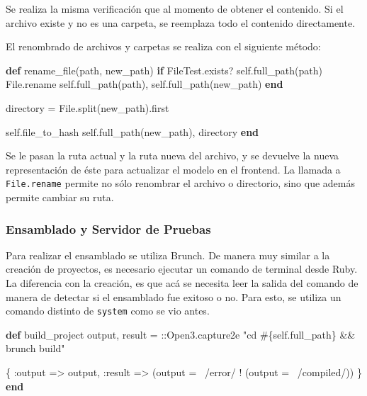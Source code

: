 \documentclass[12pt,spanish,letter]{report}
\newenvironment{Shaded}{}{}
\newcommand{\KeywordTok}[1]{\textcolor[rgb]{0.00,0.44,0.13}{\textbf{{#1}}}}
\newcommand{\DataTypeTok}[1]{\textcolor[rgb]{0.56,0.13,0.00}{{#1}}}
\newcommand{\DecValTok}[1]{\textcolor[rgb]{0.25,0.63,0.44}{{#1}}}
\newcommand{\StringTok}[1]{\textcolor[rgb]{0.25,0.44,0.63}{{#1}}}
\newcommand{\OtherTok}[1]{\textcolor[rgb]{0.00,0.44,0.13}{{#1}}}
\newcommand{\NormalTok}[1]{{#1}}
\begin{document}
Se realiza la misma verificación que al momento de obtener el contenido.
Si el archivo existe y no es una carpeta, se reemplaza todo el contenido
directamente.

El renombrado de archivos y carpetas se realiza con el siguiente método:

\begin{Shaded}
\begin{Highlighting}[]
\KeywordTok{def} \NormalTok{rename_file(path, new_path)}
  \KeywordTok{if} \DataTypeTok{FileTest}\NormalTok{.exists? }\DecValTok{self}\NormalTok{.full_path(path)}
    \DataTypeTok{File}\NormalTok{.rename }\DecValTok{self}\NormalTok{.full_path(path), }\DecValTok{self}\NormalTok{.full_path(new_path)}
  \KeywordTok{end}

  \NormalTok{directory = }\DataTypeTok{File}\NormalTok{.split(new_path).first}

  \DecValTok{self}\NormalTok{.file_to_hash }\DecValTok{self}\NormalTok{.full_path(new_path), directory}
\KeywordTok{end}
\end{Highlighting}
\end{Shaded}

Se le pasan la ruta actual y la ruta nueva del archivo, y se devuelve la
nueva representación de éste para actualizar el modelo en el frontend.
La llamada a \texttt{File.rename} permite no sólo renombrar el archivo o
directorio, sino que además permite cambiar su ruta.

\subsubsection{Ensamblado y Servidor de Pruebas}

Para realizar el ensamblado se utiliza Brunch. De manera muy similar a
la creación de proyectos, es necesario ejecutar un comando de terminal
desde Ruby. La diferencia con la creación, es que acá se necesita leer
la salida del comando de manera de detectar si el ensamblado fue exitoso
o no. Para esto, se utiliza un comando distinto de \texttt{system} como
se vio antes.

\begin{Shaded}
\begin{Highlighting}[]
\KeywordTok{def} \NormalTok{build_project}
  \NormalTok{output, result = ::}\DataTypeTok{Open3}\NormalTok{.capture2e }\StringTok{"cd }\OtherTok{#\{}\DecValTok{self}\NormalTok{.full_path}\OtherTok{\}}\StringTok{ && brunch build"}

  \NormalTok{\{}
    \StringTok{:output} \NormalTok{=> output,}
    \StringTok{:result} \NormalTok{=> (output =~ }\OtherTok{/error/} \NormalTok{\textbar{}\textbar{} ! (output =~ }\OtherTok{/compiled/}\NormalTok{))}
  \NormalTok{\}}
\KeywordTok{end}
\end{Highlighting}
\end{Shaded}
\end{document}
